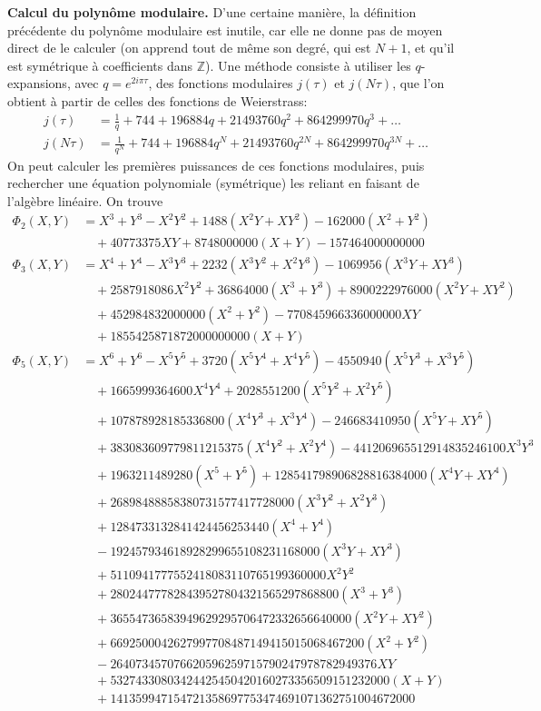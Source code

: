 \documentclass[11pt,a4paper]{article}
\newcommand{\Z}{\mathbb{Z}}
\renewcommand{\v}{\vspace{5mm}}
\theoremstyle{definition}
\begin{document}
\v

\textbf{Calcul du polynôme modulaire.} D'une certaine manière, la définition précédente du polynôme modulaire est inutile, car elle ne donne pas de moyen direct de le calculer (on apprend tout de même son degré, qui est $N+1$, et qu'il est symétrique à coefficients dans $\Z$). Une méthode consiste à utiliser les $q$-expansions, avec $q = e^{2i\pi\tau}$, des fonctions modulaires $j(\tau)$ et $j(N\tau)$, que l'on obtient à partir de celles des fonctions de Weierstrass:
$$\begin{aligned}
j(\tau) &= \frac{1}{q} + 744 + 196884 q + 21493760 q^2 + 864299970 q^3 + \ldots\\
j(N\tau) &= \frac{1}{q^N} + 744 + 196884 q^N + 21493760 q^{2N} + 864299970 q^{3N} + \ldots
\end{aligned}$$
On peut calculer les premières puissances de ces fonctions modulaires, puis rechercher une équation polynomiale (symétrique) les reliant en faisant de l'algèbre linéaire. On trouve
$$\begin{aligned}
\Phi_2(X, Y) &=  X^3 + Y^3 - X^2 Y^2 + 1488(X^2Y + X Y^2)  - 162000(X^2 + Y^2) \\
&\quad + 40773375 XY  + 8748000000(X + Y) - 157464000000000\\
\Phi_3(X, Y) &= X^4 + Y^4 - X^3 Y^3 + 2232(X^3 Y^2 + X^2 Y^3) - 1069956(X^3 Y + X Y^3)\\
&\quad + 2587918086 X^2 Y^2  + 36864000(X^3 + Y^3) + 8900222976000(X^2 Y + X Y^2)  \\
&\quad + 452984832000000(X^2 + Y^2) - 770845966336000000 XY \\
&\quad + 1855425871872000000000(X + Y)\\
\Phi_5(X, Y) &= X^6 + Y^6 -X^5 Y^5 + 3720(X^5 Y^4 + X^4 Y^5) - 4550940(X^5 Y^3 + X^3 Y^5) \\
&\quad + 1665999364600 X^4 Y^4 + 2028551200(X^5 Y^2 + X^2 Y^5) \\
&\quad + 107878928185336800(X^4 Y^3 + X^3 Y^4) - 246683410950(X^5 Y + X Y^5) \\
&\quad + 383083609779811215375(X^4 Y^2 + X^2 Y^4) - 441206965512914835246100 X^3 Y^3 \\
&\quad + 1963211489280(X^5 + Y^5) + 128541798906828816384000(X^4 Y + X Y^4) \\
&\quad + 26898488858380731577417728000(X^3 Y^2 + X^2 Y^3) \\
&\quad +  1284733132841424456253440(X^4 + Y^4) \\
&\quad - 192457934618928299655108231168000(X^3 Y + X Y^3) \\
&\quad + 5110941777552418083110765199360000 X^2 Y^2 \\
&\quad + 280244777828439527804321565297868800(X^3 + Y^3) \\
&\quad + 36554736583949629295706472332656640000(X^2 Y + X Y^2) \\
&\quad + 6692500042627997708487149415015068467200( X^2 + Y^2) \\
&\quad - 264073457076620596259715790247978782949376 XY \\
&\quad + 53274330803424425450420160273356509151232000(X + Y) \\
&\quad + 141359947154721358697753474691071362751004672000
\end{aligned}$$
\end{document}
